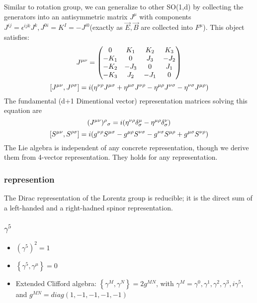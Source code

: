 Similar to rotation group, we can generalize to other SO(1,d) by collecting
the generators into an antisymmetric matrix $J^{\mu}$ with components
$J^{ij} = \epsilon^{ijk}J^k, J^{0i} = K^I = -J^{i0}$(exactly as $\vec{E},
\vec{B}$ are collected into $F^{\mu}$). This object satisfies:
\[
    J^{\mu\nu}=
    \begin{pmatrix}
	0   & K_1   & K_2   & K_3   \\
	-K_1	& 0 & J_3   & -J_2  \\
	-K_2	& -J_3	& 0 & J_1   \\
	-K_3	& J_2	& -J_1	& 0 \\
    \end{pmatrix}
    \]
\[
    [J^{\mu\nu}, J^{\rho\sigma}]=
    i( \eta^{\nu\rho}J^{\mu\sigma}
    +\eta^{\mu\sigma}J^{\nu\rho} 
    -\eta^{\mu\rho}J^{\nu\sigma}
    -\eta^{\nu\sigma}J^{\mu\rho}
    )
    \]
The fundamental (d+1 Dimentional vector) representation matrices solving
this equation are 
\[
    (J^{\mu\nu})^\rho{}_\sigma = i(\eta^{\nu\rho}\delta^{\mu}_\sigma -
    \eta^{\mu\rho}\delta^{\nu}_{\sigma})
    \]
\[
    [S^{\mu\nu}, S^{\rho\sigma}]=
    i( g^{\nu\rho}S^{\mu\sigma}
    -g^{\mu\rho}S^{\nu\sigma}
    -g^{\nu\sigma}S^{\mu\rho}
    +g^{\mu\sigma}S^{\nu\rho} )
    \]
The Lie algebra is independent of any concrete representation, though we
derive them from 4-vector representation. They holds for any representation.

\subsubsection{represention}
The Dirac representation of the Lorentz group is reducible; it is the direct
sum of a left-handed and a right-hadned spinor representation.

\subsubsection{$\gamma^5$}
\begin{itemize}
    \item $(\gamma^5)^2 = \mathcal{1}$
    \item $\left\{\gamma^5,\gamma^\mu\right\}=0$
    \item Extended Clifford algebra: $\left\{\gamma^M,\gamma^N\right\}=2g^{MN}$, with $\gamma^M =
	\gamma^0,\gamma^1,\gamma^2,\gamma^3,i\gamma^5$, and $g^{MN}=diag(1, -1, -1, -1, -1)$ 
\end{itemize}

